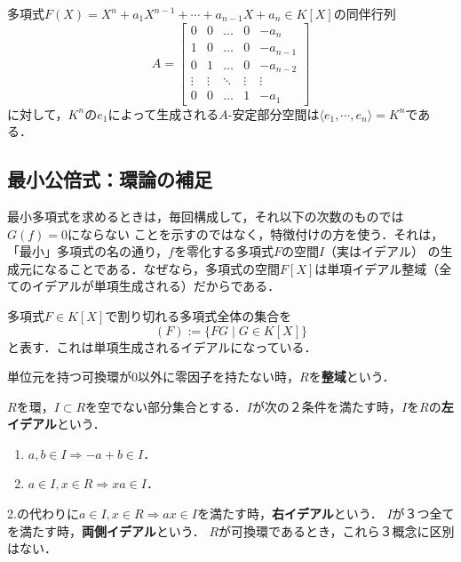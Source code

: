 \documentclass[uplatex, dvipdfmx]{jsreport}
\begin{document}
\begin{example}
    多項式$F(X) = X^n+a_1X^{n-1}+\cdots +a_{n-1}X+a_n \in K[X]$の同伴行列
        \[A=\begin{bmatrix}
        0 & 0 & \dots & 0 & -a_n \\
        1 & 0 & \dots & 0 & -a_{n-1} \\
        0 & 1 & \dots & 0 & -a_{n-2} \\
        \vdots & \vdots & \ddots & \vdots & \vdots \\
        0 & 0 & \dots & 1 & -a_1
        \end{bmatrix}\]
    に対して，$K^n$の$e_1$によって生成される$A$-安定部分空間は$\langle e_1,\cdots,e_n\rangle=K^n$である．
\end{example}

\subsection{最小公倍式：環論の補足}

\begin{tcolorbox}[colframe=ForestGreen, colback=ForestGreen!10!white, breakable]
    最小多項式を求めるときは，毎回構成して，それ以下の次数のものでは$G(f)=0$にならない
    ことを示すのではなく，特徴付けの方を使う．それは，「最小」多項式の名の通り，$f$を零化する多項式$F$の空間$I$（実はイデアル）
    の生成元になることである．なぜなら，多項式の空間$F[X]$は単項イデアル整域（全てのイデアルが単項生成される）だからである．
\end{tcolorbox}

\begin{notation}[単項イデアル]
    多項式$F\in K[X]$で割り切れる多項式全体の集合を
    \[  (F):=\{FG\mid G\in K[X]\} \]
    と表す．これは単項生成されるイデアルになっている．
\end{notation}

\begin{definition}
    単位元を持つ可換環が$0$以外に零因子を持たない時，$R$を\textbf{整域}という．
\end{definition}

\begin{definition}[ideal]
    $R$を環，$I\subset R$を空でない部分集合とする．$I$が次の２条件を満たす時，$I$を$R$の\textbf{左イデアル}という．
    \begin{enumerate}
        \item $a,b\in I\Rightarrow  -a+b\in I$．
        \item $a\in I,x\in R\Rightarrow xa\in I$．
    \end{enumerate}
    2.の代わりに$a\in I,x\in R\Rightarrow ax\in I$を満たす時，\textbf{右イデアル}という．
    $I$が３つ全てを満たす時，\textbf{両側イデアル}という．
    $R$が可換環であるとき，これら３概念に区別はない．
\end{definition}
\end{document}
